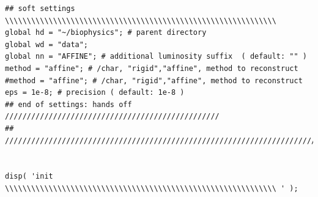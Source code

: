 \documentclass[11pt, a4paper, oneside, twocolumn]{report}
\begin{document}
\begin{verbatim}
## soft settings \\\\\\\\\\\\\\\\\\\\\\\\\\\\\\\\\\\\\\\\\\\\\\\\\\\\\\\\\\\\\\
global hd = "~/biophysics"; # parent directory
global wd = "data";
global nn = "AFFINE"; # additional luminosity suffix  ( default: "" )
method = "affine"; # /char, "rigid","affine", method to reconstruct
#method = "affine"; # /char, "rigid","affine", method to reconstruct
eps = 1e-8; # precision ( default: 1e-8 )
## end of settings: hands off /////////////////////////////////////////////////
## ///////////////////////////////////////////////////////////////////////////


disp( 'init \\\\\\\\\\\\\\\\\\\\\\\\\\\\\\\\\\\\\\\\\\\\\\\\\\\\\\\\\\\\\\ ' );


\end{verbatim}
\end{document}
